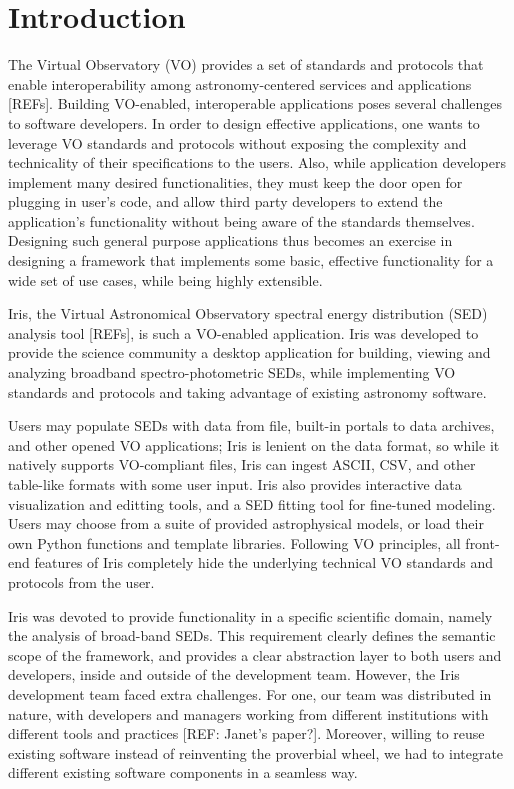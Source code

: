 \section{Introduction} 
The Virtual Observatory (VO) provides a set of standards and protocols that enable interoperability among astronomy-centered services and applications [REFs]. Building VO-enabled, interoperable applications poses several challenges to software developers. In order to design effective applications, one wants to leverage VO standards and protocols without exposing the complexity and technicality of their specifications to the users. Also, while application developers implement many desired functionalities, they must keep the door open for plugging in user's code, and allow third party developers to extend the application's functionality without being aware of the standards themselves. Designing such general purpose applications thus becomes an exercise in designing a framework that implements some basic, effective functionality for a wide set of use cases, while being highly extensible.

Iris, the Virtual Astronomical Observatory spectral energy distribution (SED) analysis tool [REFs], is such a VO-enabled application. Iris was developed to provide the science community a desktop application for building, viewing and analyzing broadband spectro-photometric SEDs, while implementing VO standards and protocols and taking advantage of existing astronomy software. 

Users may populate SEDs with data from file, built-in portals to data archives, and other opened VO applications; Iris is lenient on the data format, so while it natively supports VO-compliant files, Iris can ingest ASCII, CSV, and other table-like formats with some user input. Iris also provides interactive data visualization and editting tools, and a SED fitting tool for fine-tuned modeling. Users may choose from a suite of provided astrophysical models, or load their own Python functions and template libraries. Following VO principles, all front-end features of Iris completely hide the underlying technical VO standards and protocols from the user.

Iris was devoted to provide functionality in a specific scientific domain, namely the analysis of broad-band SEDs. This requirement clearly defines the semantic scope of the framework, and provides a clear abstraction layer to both users and developers, inside and outside of the development team. However, the Iris development team faced extra challenges. For one, our team was distributed in nature, with developers and managers working from different institutions with different tools and practices [REF: Janet's paper?]. Moreover, willing to reuse existing software instead of reinventing the proverbial wheel, we had to integrate different existing software components in a seamless way.

